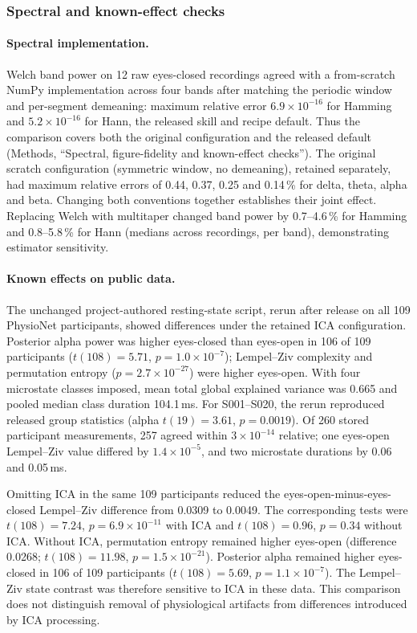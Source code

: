 \subsubsection*{Spectral and known-effect checks}

\paragraph{Spectral implementation.}

\mne{} Welch band power on 12 raw eyes-closed recordings agreed with a from-scratch NumPy implementation across four bands after matching the periodic window and per-segment demeaning: maximum relative error \(6.9\times10^{-16}\) for Hamming and \(5.2\times10^{-16}\) for Hann, the released skill and recipe default. Thus the comparison covers both the original configuration and the released default (Methods, ``Spectral, figure-fidelity and known-effect checks''). The original scratch configuration (symmetric window, no demeaning), retained separately, had maximum relative errors of 0.44, 0.37, 0.25 and 0.14\,\% for delta, theta, alpha and beta. Changing both conventions together establishes their joint effect. Replacing Welch with multitaper changed band power by 0.7--4.6\,\% for Hamming and 0.8--5.8\,\% for Hann (medians across recordings, per band), demonstrating estimator sensitivity.

\paragraph{Known effects on public data.}

The unchanged project-authored resting-state script, rerun after release on all 109 PhysioNet participants, showed differences under the retained ICA configuration. Posterior alpha power was higher eyes-closed than eyes-open in 106 of 109 participants (\(t(108) = 5.71\), \(p = 1.0\times10^{-7}\)); Lempel--Ziv complexity and permutation entropy (\(p = 2.7\times10^{-27}\)) were higher eyes-open. With four microstate classes imposed, mean total global explained variance was 0.665 and pooled median class duration 104.1\,ms. For S001--S020, the rerun reproduced released group statistics (alpha \(t(19) = 3.61\), \(p = 0.0019\)). Of 260 stored participant measurements, 257 agreed within \(3\times10^{-14}\) relative; one eyes-open Lempel--Ziv value differed by \(1.4\times10^{-5}\), and two microstate durations by 0.06 and 0.05\,ms.

Omitting ICA in the same 109 participants reduced the eyes-open-minus-eyes-closed Lempel--Ziv difference from 0.0309 to 0.0049. The corresponding tests were \(t(108) = 7.24\), \(p = 6.9\times10^{-11}\) with ICA and \(t(108) = 0.96\), \(p = 0.34\) without ICA. Without ICA, permutation entropy remained higher eyes-open (difference 0.0268; \(t(108) = 11.98\), \(p = 1.5\times10^{-21}\)). Posterior alpha remained higher eyes-closed in 106 of 109 participants (\(t(108) = 5.69\), \(p = 1.1\times10^{-7}\)). The Lempel--Ziv state contrast was therefore sensitive to ICA in these data. This comparison does not distinguish removal of physiological artifacts from differences introduced by ICA processing.

